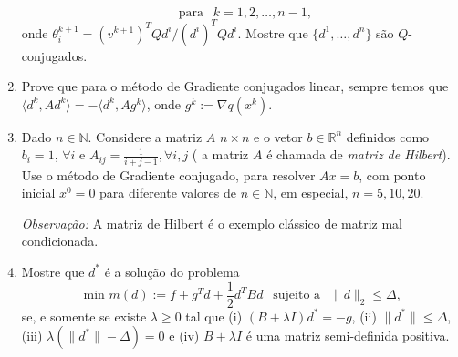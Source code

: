 \documentclass[a4paper,latin]{article}
\begin{document}
\begin{enumerate}
$$    \ \ \text{ para } \ \ k=1,2,\dots, n-1, $$ 
    onde $\theta^{k+1}_{i}=(v^{k+1})^{T}Qd^i/(d^{i})^{T}Qd^{i}$. 
    Mostre que $\{d^1,\dots,d^n\}$ são $Q$-conjugados.
    \item Prove que para o método de Gradiente conjugados linear, 
    sempre temos que 
    $\langle d^{k}, A d^{k} \rangle=-\langle d^{k}, A g^{k} \rangle$, 
    onde $g^{k}:=\nabla q(x^k)$. %
    \item Dado $n \in \mathbb{N}$. Considere a matriz $A$
    $n \times n$ e o vetor $b \in \mathbb{R}^{n}$  definidos como 
    $b_{i}=1$, $\forall i$ e $A_{ij}=\frac{1}{i+j-1}, \forall i,j$ (
    a matriz $A$ é chamada de {\it matriz de Hilbert}).
    Use o método de Gradiente conjugado, para resolver 
    $Ax=b$, com ponto inicial $x^{0}=0$ para diferente valores de 
    $n \in \mathbb{N}$, em especial, $n=5, 10, 20$.  
    
    {\it Observação:} A matriz de Hilbert é o exemplo clássico de matriz mal condicionada. 
    \item Mostre que $d^{*}$ é a solução do problema 
    $$
      \text{ min } m(d):=f+g^{T}d+\frac{1}{2} d^{T}Bd 
      \ \ \text{ sujeito a } \ \ 
      \|d\|_2 \leq \Delta, $$
    se, e somente se existe $\lambda\geq 0$ tal que 
    (i) $(B+\lambda I)d^{*}=-g$, (ii) $\|d^{*}\|\leq \Delta$, 
    (iii) $\lambda(\|d^*\|-\Delta)=0$ e (iv) $B+\lambda I$ é 
    uma matriz semi-definida positiva. 
    

\end{enumerate}
\end{document}
